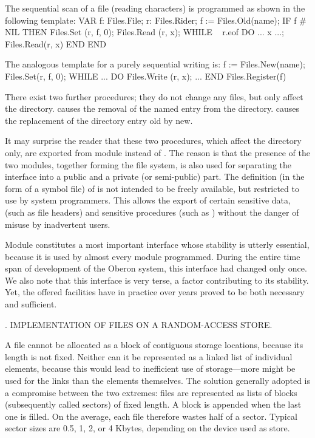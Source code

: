 The sequential scan of a file  (reading characters) is programmed as shown in the following template:
\begintt
VAR f: Files.File;
    r: Files.Rider;
f := Files.Old(name);
IF f # NIL THEN
  Files.Set (r, f, 0);
  Files.Read (r, x);
  WHILE ~ r.eof DO
    ... x ...;
    Files.Read(r, x)
  END
END
\endtt

\noindent The analogous template for a purely sequential writing is:
\begintt
f := Files.New(name);
Files.Set(r, f, 0);
WHILE ... DO Files.Write (r, x); ... END
Files.Register(f)
\endtt

There exist two further procedures; they do not change any files, but only affect the directory.  causes the removal of the named entry from the directory.  causes the replacement of the directory entry old by new.

It may surprise the reader that these two procedures, which affect the directory only, are exported from module  instead of . The reason is that the presence of the two modules, together forming the file system, is also used for separating the interface into a public and a private (or semi-public) part. The definition (in the form of a symbol file) of  is not intended to be freely available, but restricted to use by system programmers. This allows the export of certain sensitive data, (such as file headers) and sensitive procedures (such as ) without the danger of misuse by inadvertent users.

Module  constitutes a most important interface whose stability is utterly essential, because it is used by almost every module programmed. During the entire time span of development of the Oberon system, this interface had changed only once. We also note that this interface is very terse, a factor contributing to its stability. Yet, the offered facilities have in practice over years proved to be both necessary and sufficient.

. IMPLEMENTATION OF FILES ON A RANDOM-ACCESS STORE.

A file cannot be allocated as a block of contiguous storage locations, because its length is not fixed. Neither can it be represented as a linked list of individual elements, because this would lead to inefficient use of storage---more might be used for the links than the elements themselves. The solution generally adopted is a compromise between the two extremes: files are represented as lists of blocks (subsequently called sectors) of fixed length. A block is appended when the last one is filled. On the average, each file therefore wastes half of a sector. Typical sector sizes are 0.5, 1, 2, or 4 Kbytes, depending on the device used as store.

